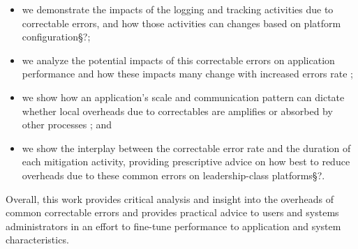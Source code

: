 \begin{itemize}

\item we demonstrate the impacts of the logging and tracking activities due to correctable
errors, and how those activities can changes based on platform configuration\S{?};
\item we analyze the potential impacts of this correctable errors on application
performance and how these impacts many change with increased errors rate ;
\item we show how an application's scale and communication pattern can dictate
whether local overheads due to correctables are amplifies or absorbed by other
processes ; and
\item we show the interplay between the correctable error rate and the duration
of each mitigation activity, providing prescriptive advice on how best to reduce
overheads due to these common errors on leadership-class platforms\S{?}.

\end{itemize}

Overall, this work provides critical analysis and insight into the overheads of
common correctable errors and provides practical advice to users and systems
administrators in an effort to fine-tune performance to application and system
characteristics.
